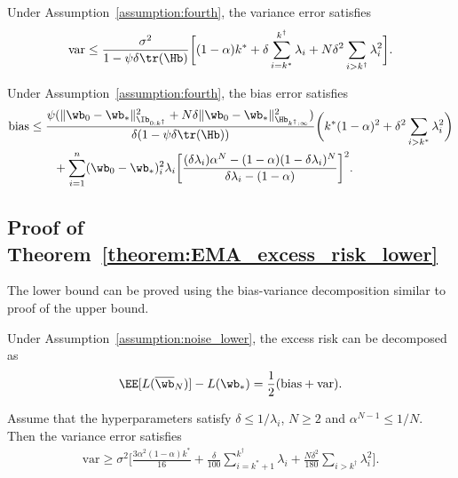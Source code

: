 \documentclass[11pt]{article}
\newcommand{\owb}{\overline{\wb}}
\begin{document}
\begin{lemma}\label{lemma:variance_upper_bound}
Under Assumption~\ref{assumption:fourth}, the variance error satisfies
\begin{align*}
\mathrm{var}\le\frac{\sigma^2}{1-\psi\delta\tr(\Hb)}\bigg[(1-\alpha)k^*+\delta\sum_{i=k^*}^{k^\dagger}\lambda_i+N\delta^2\sum_{i>k^\dagger}\lambda_i^2\bigg].
\end{align*}
\end{lemma}

\begin{lemma}\label{lemma:bias_upper_bound}
Under Assumption~\ref{assumption:fourth}, the bias error satisfies
\begin{align*}
\mathrm{bias}&\le\frac{\psi(\|\wb_0-\wb_*\|_{\Ib_{0:k^\dagger}}^2+N\delta\|\wb_0-\wb_*\|_{\Hb_{k^\dagger:\infty}}^2)}{\delta(1-\psi\delta\tr(\Hb))}\bigg(k^*(1-\alpha)^2+\delta^2\sum_{i>k^*}\lambda_i^2\bigg)\\
&\qquad+\sum_{i=1}^n(\wb_0-\wb_*)_i^2\lambda_i\bigg[\frac{(\delta\lambda_i)\alpha^N-(1-\alpha)(1-\delta\lambda_i)^N}{\delta\lambda_i-(1-\alpha)}\bigg]^2.
\end{align*}
\end{lemma}

\subsection{Proof of Theorem~\ref{theorem:EMA_excess_risk_lower}}\label{subsection:proof_EMA_excess_risk_lower}

The lower bound can be proved using the bias-variance decomposition similar to proof of the upper bound.

\begin{lemma}\label{lemma:bias_variance_decomp_lower}
Under Assumption~\ref{assumption:noise_lower}, the excess risk can be decomposed as
\begin{align*}
\EE[L(\owb_N)]-L(\wb_*)=\frac12(\mathrm{bias}+\mathrm{var}).
\end{align*}
\end{lemma}

\begin{lemma}\label{lemma:variance_lower_bound}
Assume that the hyperparameters satisfy $\delta\le1/\lambda_i$, $N\ge2$ and $\alpha^{N-1}\le1/N$. Then the variance error satisfies
\begin{align*}
\mathrm{var}\ge\sigma^2\bigg[\frac{3\alpha^2(1-\alpha)k^*}{16}+\frac{\delta}{100}\sum_{i=k^*+1}^{k^\dagger}\lambda_i+\frac{N\delta^2}{180}\sum_{i>k^\dagger}\lambda_i^2\bigg].
\end{align*}
\end{lemma}
\end{document}
